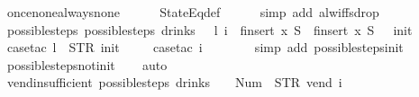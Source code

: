\begin{isabellebody}
\ once{\isacharunderscore}none{\isacharunderscore}always{\isacharunderscore}none\isanewline
\ \ \ \ \isamarkupfalse%
\ StateEq{\isacharunderscore}def\isanewline
\ \ \ \ \isamarkupfalse%
\ {\isacharparenleft}simp\ add{\isacharcolon}\ alw{\isacharunderscore}iff{\isacharunderscore}sdrop{\isacharparenright}\isanewline
{}\isamarkupfalse%
%
\endisatagproof
{\isafoldproof}%
%
\isadelimproof
\isanewline
%
\endisadelimproof
\isanewline
{}\isamarkupfalse%
\ possible{\isacharunderscore}steps{\isacharunderscore}{}{\isacharcolon}\ {\isachardoublequoteopen}possible{\isacharunderscore}steps\ drinks\ {}\ {\isacharless}{\isachargreater}\ l\ i\ {\isacharequal}\ finsert\ x\ S{\isacharprime}\ {\isasymLongrightarrow}\ finsert\ x\ S{\isacharprime}\ {\isacharequal}\ {\isacharbraceleft}{\isacharbar}{\isacharparenleft}{}{\isacharcomma}\ init{\isacharparenright}{\isacharbar}{\isacharbraceright}{\isachardoublequoteclose}\isanewline
%
\isadelimproof
\ \ %
\endisadelimproof
%
\isatagproof
{}\isamarkupfalse%
\ {\isacharparenleft}case{\isacharunderscore}tac\ {\isachardoublequoteopen}l\ {\isacharequal}\ STR\ {\isacharprime}{\isacharprime}init{\isacharprime}{\isacharprime}{\isachardoublequoteclose}{\isacharparenright}\isanewline
\ \ \ \isamarkupfalse%
\ {\isacharparenleft}case{\isacharunderscore}tac\ {\isachardoublequoteopen}i\ {\isacharequal}\ {\isacharbrackleft}{\isacharbrackright}{\isachardoublequoteclose}{\isacharparenright}\isanewline
\ \ \ \ \isamarkupfalse%
\ {\isacharparenleft}simp\ add{\isacharcolon}\ possible{\isacharunderscore}steps{\isacharunderscore}init{\isacharparenright}\isanewline
\ \ \isamarkupfalse%
\ possible{\isacharunderscore}steps{\isacharunderscore}not{\isacharunderscore}init\isanewline
\ \ \isamarkupfalse%
\ auto%
\endisatagproof
{\isafoldproof}%
%
\isadelimproof
\isanewline
%
\endisadelimproof
\isanewline
{}\isamarkupfalse%
\ vend{\isacharunderscore}insufficient{\isacharcolon}\ {\isachardoublequoteopen}possible{\isacharunderscore}steps\ drinks\ {}\ {\isacharparenleft}{\isacharless}{\isachargreater}{\isacharparenleft}{}\ {\isacharcolon}{\isacharequal}\ Num\ {}{\isacharparenright}{\isacharparenright}\ STR\ {\isacharprime}{\isacharprime}vend{\isacharprime}{\isacharprime}\ i\ {\isacharequal}\ {\isacharbraceleft}{\isacharbar}{\isacharbar}{\isacharbraceright}{\isachardoublequoteclose}\isanewline
%
\isadelimproof
\ \ %
\endisadelimproof

\end{isabellebody}
